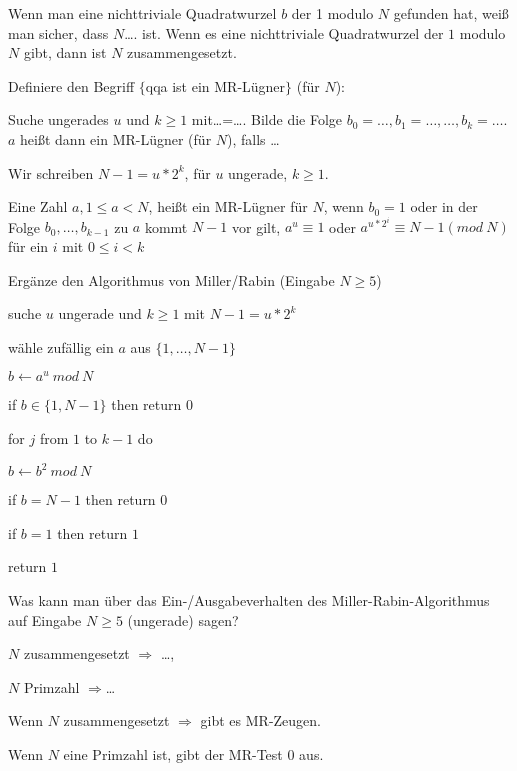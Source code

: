 \documentclass[avery5371, frame]{flashcards}
\begin{document}
\begin{flashcard}[Primzahlen]{Wenn man eine nichttriviale Quadratwurzel $b$ der 1 modulo $N$ gefunden hat, weiß man sicher, dass $N$\dots. ist.}
    Wenn es eine nichttriviale Quadratwurzel der $1$ modulo $N$ gibt, dann ist $N$ zusammengesetzt.
\end{flashcard}

\begin{flashcard}[Primzahlen]{Definiere den Begriff $\{$qqa ist ein MR-Lügner$\}$ (für $N$):

        Suche ungerades $u$ und $k\geq 1$ mit\dots=\dots .
        Bilde die Folge $b_0=\dots,b_1=\dots,\dots,b_k=\dots$.
        $a$ heißt dann ein MR-Lügner (für $N$), falls \dots}

    Wir schreiben $N-1=u*2^k$, für $u$ ungerade, $k\geq 1$.

    Eine Zahl $a, 1\leq a < N$, heißt ein MR-Lügner für $N$, wenn $b_0=1$ oder in der Folge $b_0,\dots,b_{k-1}$ zu $a$ kommt $N-1$ vor gilt, $a^u\equiv 1$ oder $a^{u*2^i}\equiv N-1 (mod\ N)$ für ein $i$ mit $0\leq i < k$
\end{flashcard}

\begin{flashcard}[Primzahlen]{Ergänze den Algorithmus von Miller/Rabin (Eingabe $N\geq 5$)}
    \begin{itemize*}
        \item[] suche $u$ ungerade und $k\geq 1$ mit $N-1 =u*2^k$
        \item[] wähle zufällig ein $a$ aus $\{1 ,\dots,N-1\}$
        \item[] $b \leftarrow a^u\ mod\ N$ %
        \item[] if $b\in\{1,N-1\}$ then return $0$
        \item[] for $j$ from $1$ to $k-1$ do %
        \begin{itemize*}
            \item[] $b\leftarrow b^2\ mod\ N$
        \end{itemize*}
        \item[] if $b=N-1$ then return $0$
        \item[] if $b=1$ then return $1$
        \item[] return $1$
    \end{itemize*}
\end{flashcard}

\begin{flashcard}[Primzahlen]{Was kann man über das Ein-/Ausgabeverhalten des Miller-Rabin-Algorithmus auf Eingabe $N\geq 5$ (ungerade) sagen?

        $N$ zusammengesetzt $\Rightarrow$ \dots,

        $N$ Primzahl $\Rightarrow$\dots}
    Wenn $N$ zusammengesetzt $\Rightarrow$ gibt es MR-Zeugen.

    Wenn $N$ eine Primzahl ist, gibt der MR-Test $0$ aus.
\end{flashcard}
\end{document}

